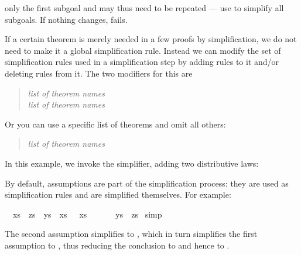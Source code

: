 \begin{isabellebody}
\begin{isamarkuptext}
only the first subgoal and may thus need to be repeated --- use
 to simplify all subgoals.
If nothing changes,  fails.%
\end{isamarkuptext}%
\isamarkuptrue%
%
\isamarkuptrue%
%
\begin{isamarkuptext}%
%
If a certain theorem is merely needed in a few proofs by simplification,
we do not need to make it a global simplification rule. Instead we can modify
the set of simplification rules used in a simplification step by adding rules
to it and/or deleting rules from it. The two modifiers for this are
\begin{quote}
 \textit{list of theorem names}\\
 \textit{list of theorem names}
\end{quote}
Or you can use a specific list of theorems and omit all others:
\begin{quote}
 \textit{list of theorem names}
\end{quote}
In this example, we invoke the simplifier, adding two distributive
laws:
\begin{quote}
\end{quote}%
\end{isamarkuptext}%
\isamarkuptrue%
%
\isamarkuptrue%
%
\begin{isamarkuptext}%
By default, assumptions are part of the simplification process: they are used
as simplification rules and are simplified themselves. For example:%
\end{isamarkuptext}%
\isamarkuptrue%
\ {\isachardoublequote}{\isasymlbrakk}\ xs\ {\isacharat}\ zs\ {\isacharequal}\ ys\ {\isacharat}\ xs{\isacharsemicolon}\ {\isacharbrackleft}{\isacharbrackright}\ {\isacharat}\ xs\ {\isacharequal}\ {\isacharbrackleft}{\isacharbrackright}\ {\isacharat}\ {\isacharbrackleft}{\isacharbrackright}\ {\isasymrbrakk}\ {\isasymLongrightarrow}\ ys\ {\isacharequal}\ zs{\isachardoublequote}\isanewline
\isamarkupfalse%
\ simp\isanewline
\isamarkupfalse%
\isamarkupfalse%
%
\begin{isamarkuptext}%
\noindent
The second assumption simplifies to , which in turn
simplifies the first assumption to , thus reducing the
conclusion to  and hence to .


\end{isamarkuptext}
\end{isabellebody}
